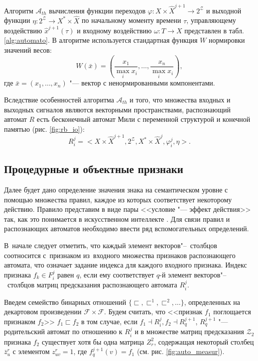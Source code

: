 \documentclass[a4paper, 12pt]{article}
\theoremstyle{break}
\numberwithin{equation}{section}
\begin{document}
	Алгоритм $\mathcal A_{th}$ вычисления функции переходов $\varphi:X\times\hat X^{j+1}\to 2^{\mathcal Z}$ и выходной функции $\eta:2^{\mathcal Z}\to X^*\times\hat X$ по начальному моменту времени $\tau$, управляющему воздействию $\hat x^{j+1}(\tau)$ и входному воздействию $\omega:T\to X$ представлен в табл. \ref{alg:automato}. В алгоритме используется стандартная функция $W$ нормировки значений весов:
	\begin{equation*}
	W(\bar x)=\left(\frac{x_1}{\max\limits_i x_i},\dots,\frac{x_n}{\max\limits_i x_i}\right),
	\end{equation*} 
	где $\bar x=(x_1,\dots,x_n)$ "--- вектор с ненормированными компонентами.
	
	Вследствие особенностей алгоритма $\mathcal A_{th}$ и  того, что множества входных и выходных сигналов являются векторными пространствами, распознающий автомат $R$ есть бесконечный автомат Мили с переменной структурой и конечной памятью (рис. \ref{fig:rb_io}): 
	\begin{equation*}
	R_i^j=<X\times\hat X^{j+1}, 2^{\mathcal Z}, X^*\times\hat X^j,\varphi_i^j,\eta>.
	\end{equation*}

	\subsection{Процедурные и объектные признаки}
	Далее будет дано определение значения знака на семантическом уровне с помощью множества правил, каждое из которых соответствует некоторому действию. Правило представим в виде пары <<условие "--- эффект действия>> так, как это понимается в искусственном интеллекте \cite{Nilson1985, Osipov2002c}. Для связи правил и распознающих автоматов необходимо ввести ряд вспомогательных определений. 

	В~начале следует отметить, что каждый элемент векторов"--~столбцов соотносится с~признаком из~входного множества признаков распознающего автомата, что означает задание индекса для каждого входного признака. Индекс признака $f_k\in F_i^j$ равен  $q$, если ему соответствует $q$-й элемент векторов"--~столбцов матриц предсказания распознающего автомата $R_i^j$. 
	
	Введем семейство бинарных отношений $\{\sqsubset,\sqsubset^1,\sqsubset^2,\dots\}$, определенных на декартовом произведении $\mathcal F\times \mathcal F$. Будем считать, что <<признак $f_1$ поглощается признаком $f_2$>> $f_1\sqsubset f_2$ в том случае, если $f_1\dashv R_i^j, f_2\dashv R_q^{j+1}$, $R_q^{j+1}$ "--- родительский автомат по отношению к $R_i^j$ и в множестве матриц предсказания $\mathcal Z_2$ признака $f_2$ существует хотя бы одна матрица $Z_r^2$, содержащая некоторый столбец $\bar z_u^r$ с элементом $z_{uv}^r=1$, где $f_q^{j+1}(v)=f_1$ (см. рис. \ref{fig:auto_measur}).
		
\end{document}
